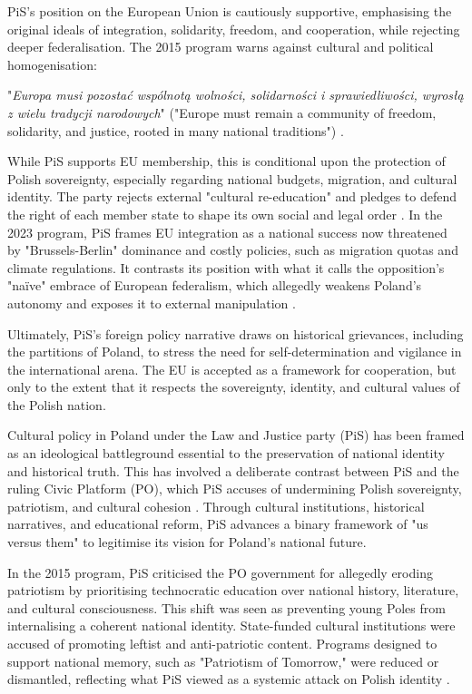 PiS's position on the European Union is cautiously supportive, emphasising the original ideals of integration, solidarity, freedom, and cooperation, while rejecting deeper federalisation. The 2015 program warns against cultural and political homogenisation:

\begin{displayquote}
"\textit{Europa musi pozostać wspólnotą wolności, solidarności i sprawiedliwości, wyrosłą z wielu tradycji narodowych}" ("Europe must remain a community of freedom, solidarity, and justice, rooted in many national traditions") \citep{pis_program_2014}.
\end{displayquote}

While PiS supports EU membership, this is conditional upon the protection of Polish sovereignty, especially regarding national budgets, migration, and cultural identity. The party rejects external "cultural re-education" and pledges to defend the right of each member state to shape its own social and legal order \citep{pis_program_2014}. In the 2023 program, PiS frames EU integration as a national success now threatened by "Brussels-Berlin" dominance and costly policies, such as migration quotas and climate regulations. It contrasts its position with what it calls the opposition's "naïve" embrace of European federalism, which allegedly weakens Poland's autonomy and exposes it to external manipulation \citep{pis_program_2023}.

Ultimately, PiS's foreign policy narrative draws on historical grievances, including the partitions of Poland, to stress the need for self-determination and vigilance in the international arena. The EU is accepted as a framework for cooperation, but only to the extent that it respects the sovereignty, identity, and cultural values of the Polish nation.

Cultural policy in Poland under the Law and Justice party (PiS) has been framed as an ideological battleground essential to the preservation of national identity and historical truth. This has involved a deliberate contrast between PiS and the ruling Civic Platform (PO), which PiS accuses of undermining Polish sovereignty, patriotism, and cultural cohesion \citep{pis_program_2023}. Through cultural institutions, historical narratives, and educational reform, PiS advances a binary framework of "us versus them" to legitimise its vision for Poland's national future.

In the 2015 program, PiS criticised the PO government for allegedly eroding patriotism by prioritising technocratic education over national history, literature, and cultural consciousness. This shift was seen as preventing young Poles from internalising a coherent national identity. State-funded cultural institutions were accused of promoting leftist and anti-patriotic content. Programs designed to support national memory, such as "Patriotism of Tomorrow," were reduced or dismantled, reflecting what PiS viewed as a systemic attack on Polish identity \citep{pis_program_2014}.

